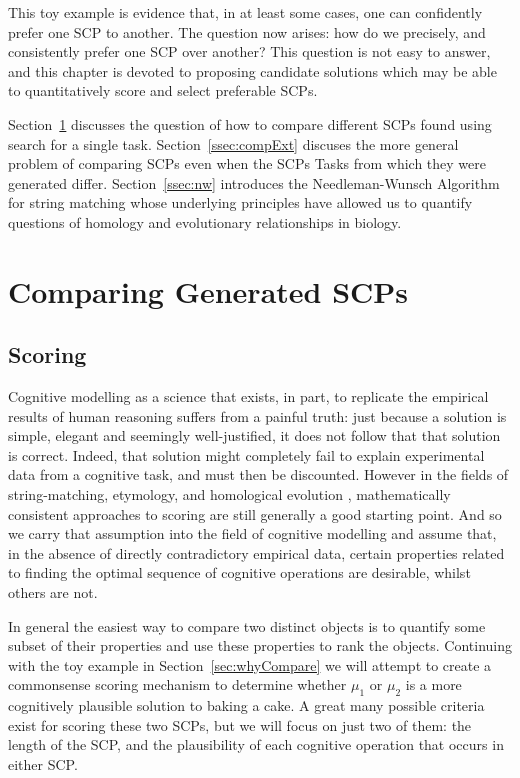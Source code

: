 This toy example is evidence that, in at least some cases, one can confidently prefer one SCP to another. The question now arises: how do we precisely, and consistently prefer one SCP over another? This question is not easy to answer, and this chapter is devoted to proposing candidate solutions which may be able to quantitatively score and select preferable SCPs.

Section~\ref{ssec:compGen} discusses the question of how to compare different SCPs found using search for a single task. Section~\ref{ssec:compExt} discuses the more general problem of comparing SCPs even when the SCPs Tasks from which they were generated differ. Section~\ref{ssec:nw} introduces the Needleman-Wunsch Algorithm for string matching whose underlying principles have allowed us to quantify questions of homology and evolutionary relationships in biology.

\section{Comparing Generated SCPs} \label{ssec:compGen}
\subsection{Scoring}
Cognitive modelling as a science that exists, in part, to replicate the empirical results of human reasoning suffers from a painful truth: just because a solution is simple, elegant and seemingly well-justified, it does not follow that that solution is correct. Indeed, that solution might completely fail to explain experimental data from a cognitive task, and must then be discounted. However in the fields of string-matching, etymology, and homological evolution \citep{sweetser1990etymology} \citep{needleman1970general} , mathematically consistent approaches to scoring are still generally a good starting point. And so we carry that assumption into the field of cognitive modelling and assume that, in the absence of directly contradictory empirical data, certain properties related to finding the optimal sequence of cognitive operations are desirable, whilst others are not.

In general the easiest way to compare two distinct objects is to quantify some subset of their properties and use these properties to rank the objects. Continuing with the toy example in Section~\ref{sec:whyCompare} we will attempt to create a commonsense scoring mechanism to determine whether $\mu_1$ or $\mu_2$ is a more cognitively plausible solution to baking a cake. A great many possible criteria exist for scoring these two SCPs, but we will focus on just two of them: the length of the SCP, and the plausibility of each cognitive operation that occurs in either SCP.

